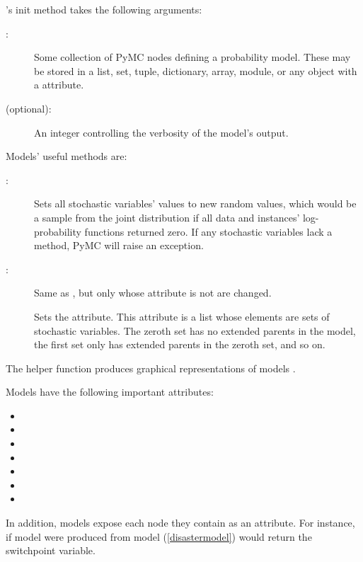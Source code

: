 's init method takes the following arguments:
\begin{description}
    \item[:] Some collection of PyMC nodes defining a probability model. These may be stored in a list, set, tuple, dictionary, array, module, or any object with a  attribute.
    \item[ (optional):] An integer controlling the verbosity of the model's output.
\end{description}

Models' useful methods are:
\begin{description}
    \item[:] Sets all stochastic variables' values to new random values, which would be a sample from the joint distribution if all data and  instances' log-probability functions returned zero. If any stochastic variables lack a  method, PyMC will raise an exception.
    \item[:] Same as , but only  whose  attribute is not  are changed.
    \item[] Sets the  attribute. This attribute is a list whose elements are sets of stochastic variables. The zeroth set has no extended parents in the model, the first set only has extended parents in the zeroth set, and so on.
\end{description}

The helper function  produces graphical representations of models \cite[see]{Jordan:2004p5439}.

Models have the following important attributes:
\begin{itemize}
    \item {}
    \item {}
    \item {}
    \item {}
    \item {}
    \item {}
    \item {}
\end{itemize}

In addition, models expose each node they contain as an attribute. For instance, if model  were produced from model (\ref{disastermodel})  would return the switchpoint variable.


